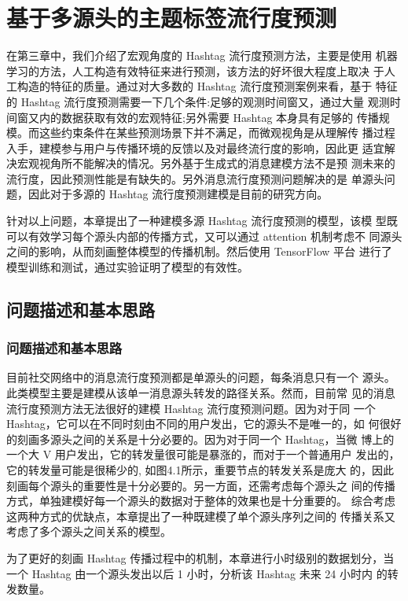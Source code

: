 \chapter{基于多源头的主题标签流行度预测}\label{chap:four}

在第三章中，我们介绍了宏观角度的 Hashtag 流行度预测方法，主要是使用 机器学习的方法，人工构造有效特征来进行预测，该方法的好坏很大程度上取决 于人工构造的特征的质量。通过对大多数的 Hashtag 流行度预测案例来看，基于 特征的 Hashtag 流行度预测需要一下几个条件:足够的观测时间窗又，通过大量 观测时间窗又内的数据获取有效的宏观特征;另外需要 Hashtag 本身具有足够的 传播规模。而这些约束条件在某些预测场景下并不满足，而微观视角是从理解传 播过程入手，建模参与用户与传播环境的反馈以及对最终流行度的影响，因此更 适宜解决宏观视角所不能解决的情况。另外基于生成式的消息建模方法不是预 测未来的流行度，因此预测性能是有缺失的。另外消息流行度预测问题解决的是 单源头问题，因此对于多源的 Hashtag 流行度预测建模是目前的研究方向。

针对以上问题，本章提出了一种建模多源 Hashtag 流行度预测的模型，该模 型既可以有效学习每个源头内部的传播方式，又可以通过 attention 机制考虑不 同源头之间的影响，从而刻画整体模型的传播机制。然后使用 TensorFlow 平台 进行了模型训练和测试，通过实验证明了模型的有效性。
\section{问题描述和基本思路}
\subsection{问题描述和基本思路}
目前社交网络中的消息流行度预测都是单源头的问题，每条消息只有一个 源头。此类模型主要是建模从该单一消息源头转发的路径关系。然而，目前常 见的消息流行度预测方法无法很好的建模 Hashtag 流行度预测问题。因为对于同 一个 Hashtag，它可以在不同时刻由不同的用户发出，它的源头不是唯一的，如 何很好的刻画多源头之间的关系是十分必要的。因为对于同一个 Hashtag，当微 博上的一个大 V 用户发出，它的转发量很可能是暴涨的，而对于一个普通用户 发出的，它的转发量可能是很稀少的, 如图4.1所示，重要节点的转发关系是庞大 的，因此刻画每个源头的重要性是十分必要的。另一方面，还需考虑每个源头之 间的传播方式，单独建模好每一个源头的数据对于整体的效果也是十分重要的。 综合考虑这两种方式的优缺点，本章提出了一种既建模了单个源头序列之间的 传播关系又考虑了多个源头之间关系的模型。

为了更好的刻画 Hashtag 传播过程中的机制，本章进行小时级别的数据划分，当一个 Hashtag 由一个源头发出以后 1 小时，分析该 Hashtag 未来 24 小时内 的转发数量。

